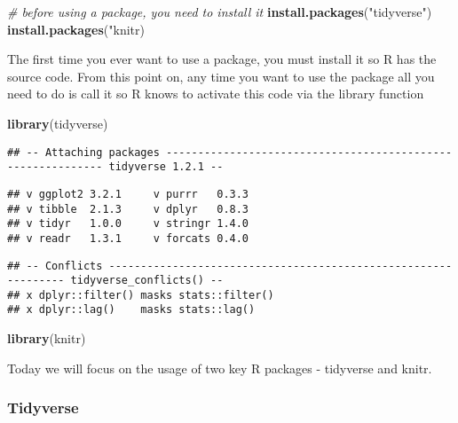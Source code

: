 \documentclass[]{article}
\newenvironment{Shaded}{\begin{snugshade}}{\end{snugshade}}
\newcommand{\CommentTok}[1]{\textcolor[rgb]{0.56,0.35,0.01}{\textit{#1}}}
\newcommand{\KeywordTok}[1]{\textcolor[rgb]{0.13,0.29,0.53}{\textbf{#1}}}
\newcommand{\NormalTok}[1]{#1}
\newcommand{\StringTok}[1]{\textcolor[rgb]{0.31,0.60,0.02}{#1}}
\begin{document}
\begin{Shaded}
\begin{Highlighting}[]
\CommentTok{# before using a package, you need to install it}
\KeywordTok{install.packages}\NormalTok{(}\StringTok{"tidyverse"}\NormalTok{)}
\KeywordTok{install.packages}\NormalTok{(}\StringTok{"knitr)}
\end{Highlighting}
\end{Shaded}

The first time you ever want to use a package, you must install it so R
has the source code. From this point on, any time you want to use the
package all you need to do is call it so R knows to activate this code
via the library function

\begin{Shaded}
\begin{Highlighting}[]
\KeywordTok{library}\NormalTok{(tidyverse)}
\end{Highlighting}
\end{Shaded}

\begin{verbatim}
## -- Attaching packages ------------------------------------------------------------ tidyverse 1.2.1 --
\end{verbatim}

\begin{verbatim}
## v ggplot2 3.2.1     v purrr   0.3.3
## v tibble  2.1.3     v dplyr   0.8.3
## v tidyr   1.0.0     v stringr 1.4.0
## v readr   1.3.1     v forcats 0.4.0
\end{verbatim}

\begin{verbatim}
## -- Conflicts --------------------------------------------------------------- tidyverse_conflicts() --
## x dplyr::filter() masks stats::filter()
## x dplyr::lag()    masks stats::lag()
\end{verbatim}

\begin{Shaded}
\begin{Highlighting}[]
\KeywordTok{library}\NormalTok{(knitr)}
\end{Highlighting}
\end{Shaded}

Today we will focus on the usage of two key R packages - tidyverse and
knitr.

\hypertarget{tidyverse}{%
\subsubsection{Tidyverse}\label{tidyverse}}
\end{document}
